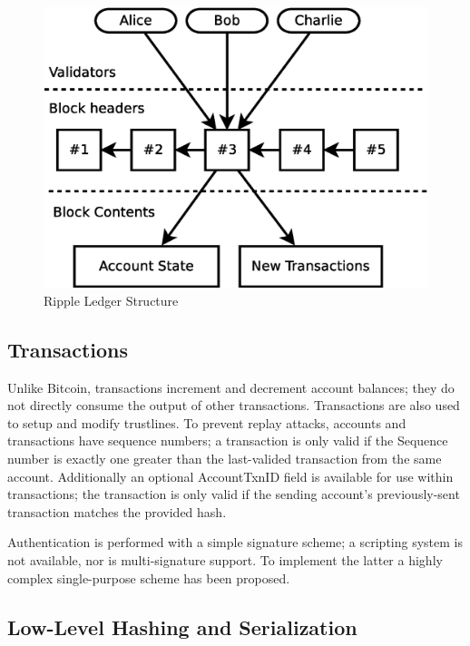 \documentclass{article}
\begin{document}
\begin{figure}
    \centering
    \includegraphics[scale=0.35]{figures/ledger-blockchain.eps}
    \caption{Ripple Ledger Structure}
    \label{fig:ledger-blockchain}
\end{figure}


\subsection{Transactions}

Unlike Bitcoin, transactions increment and decrement account balances; they do
not directly consume the output of other transactions. Transactions are also
used to setup and modify trustlines. To prevent replay attacks, accounts and
transactions have sequence numbers; a transaction is only valid if the Sequence
number is exactly one greater than the last-valided transaction from the same
account. Additionally an optional AccountTxnID field is available for use
within transactions; the transaction is only valid if the sending account's
previously-sent transaction matches the provided hash.

Authentication is performed with a simple signature scheme; a scripting system
is not available, nor is multi-signature support. To implement the latter a
highly complex single-purpose scheme\cite{ripple-wiki-multisign} has been
proposed.


\subsection{Low-Level Hashing and Serialization}
\end{document}
